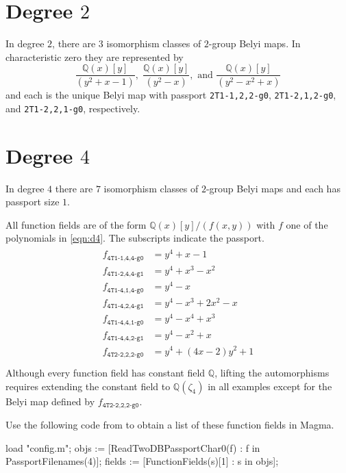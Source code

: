 \documentclass{dcthesis}
\newcommand{\QQ}{\mathbb Q}
\numberwithin{equation}{section}
\theoremstyle{definition}
\theoremstyle{remark}
\begin{document}
{{  \section{Degree $2$}{
    \label{sec:d2}
    In degree $2$,
    there are $3$
    isomorphism classes of
    $2$-group Belyi maps.
    In characteristic zero they are
    represented by
    \begin{equation}
      \label{eqn:d2}
      \frac{\QQ(x)[y]}{(y^2 + x - 1)},\;
      \frac{\QQ(x)[y]}{(y^2 - x)},
      \text{ and }
      \frac{\QQ(x)[y]}{(y^2 - x^2 + x)}
    \end{equation}
    and each is the unique
    Belyi map with passport
    \texttt{2T1-1,2,2-g0},
    \texttt{2T1-2,1,2-g0},
    and
    \texttt{2T1-2,2,1-g0},
    respectively.
  }
  \section{Degree $4$}{
    \label{sec:d4}
    In degree $4$ there are $7$
    isomorphism classes of
    $2$-group Belyi maps
    and each has
    passport size $1$.
    \par
    All function fields are of the form
    $\QQ(x)[y]/(f(x,y))$
    with $f$ one of the polynomials in
    \eqref{eqn:d4}.
    The subscripts indicate the passport.
    \begin{align}
      \label{eqn:d4}
      \begin{split}
        f_{\texttt{4T1-1,4,4-g0}}
        &= y^4 + x - 1\\
        f_{\texttt{4T1-2,4,4-g1}}
        &= y^4 + x^3 - x^2\\
        f_{\texttt{4T1-4,1,4-g0}}
        &= y^4 - x\\
        f_{\texttt{4T1-4,2,4-g1}}
        &= y^4 - x^3 + 2x^2 - x\\
        f_{\texttt{4T1-4,4,1-g0}}
        &= y^4 - x^4 + x^3\\
        f_{\texttt{4T1-4,4,2-g1}}
        &= y^4 - x^2 + x\\
        f_{\texttt{4T2-2,2,2-g0}}
        &= y^4 + (4x - 2)y^2 + 1\\
      \end{split}
    \end{align}
    Although every function field has
    constant field $\QQ$,
    lifting the automorphisms
    requires extending the constant
    field to $\QQ(\zeta_{4})$
    in all examples except for the
    Belyi map defined by
    $f_{\texttt{4T2-2,2,2-g0}}$.
    \par
    Use the following code from
    \cite{twogroupdessins}
    to obtain a list of these
    function fields in \textsf{Magma}.
    \begin{magma}
load "config.m";
objs := [ReadTwoDBPassportChar0(f) : f in PassportFilenames(4)];
fields := [FunctionFields(s)[1] : s in objs];
    \end{magma}
  }
}}
\end{document}
